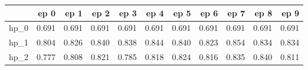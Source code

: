 \begin{tabular}{lrrrrrrrrrr}
\toprule
{} &   ep 0 &   ep 1 &   ep 2 &   ep 3 &   ep 4 &   ep 5 &   ep 6 &   ep 7 &   ep 8 &   ep 9 \\
\midrule
hp\_0 &  0.691 &  0.691 &  0.691 &  0.691 &  0.691 &  0.691 &  0.691 &  0.691 &  0.691 &  0.691 \\
hp\_1 &  0.804 &  0.826 &  0.840 &  0.838 &  0.844 &  0.840 &  0.823 &  0.854 &  0.834 &  0.834 \\
hp\_2 &  0.777 &  0.808 &  0.821 &  0.785 &  0.818 &  0.824 &  0.816 &  0.835 &  0.840 &  0.811 \\
\bottomrule
\end{tabular}
